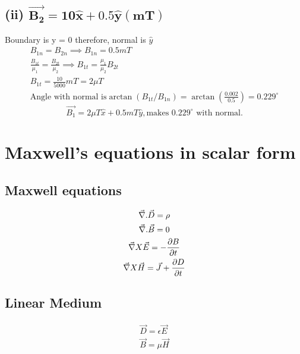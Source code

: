 \documentclass[11pt, a4paper]{article}
\begin{document}
\subsection*{(ii) \(\mathbf{\vec{B_2} = 10 \hat{x} + 0.5 \hat{y} (mT)}\) }
Boundary is y = 0 therefore, normal is \(\hat{y} \) 
\begin{gather}
    B_{1n}  = B_{2n} \implies B_{1n} = 0.5 mT\\
    \frac{B_{1t}}{\mu_1} = \frac{B_{2t}}{\mu_2} \implies B_{1t} = \frac{\mu_1}{\mu_2}B_{2t}\\
    B_{1t} = \frac{10}{5000}mT = 2 \mu T\\
    \text{Angle with normal is} \arctan(B_{1t}/B_{1n}) = \arctan(\frac{0.002}{0.5}) = 0.229^{\circ}
\end{gather}
\begin{equation}
    \boxed{\vec{B_1} = 2\mu T\hat{x}  +0.5mT \hat{y} , \text{makes } 0.229^{\circ} \text{ with normal.}}
\end{equation}
\section{Maxwell's equations in scalar form}
\subsection*{Maxwell equations}
\begin{gather}  
   \vec{\nabla}.\vec{D} = \rho\\
   \vec{\nabla}. \vec{B} = 0 \\
   \vec{\nabla}X\vec{E}  = -\pdv{B}{t}\\
   \vec{\nabla}X\vec{H} = \vec{J}+\pdv{D}{t}
\end{gather}
\subsection*{Linear Medium}
\begin{gather}
    \vec{D} = \epsilon \vec{E}\\
    \vec{B} = \mu \vec{H}
\end{gather}
\end{document}
